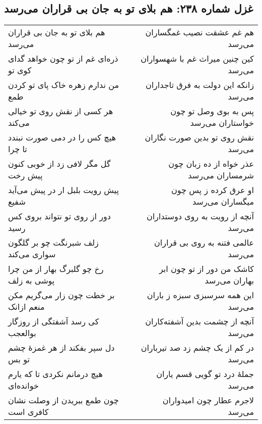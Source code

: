 \begin{center}
\section*{غزل شماره ۲۳۸: هم بلای تو به جان بی قراران می‌رسد}
\label{sec:238}
\begin{longtable}{l p{0.5cm} r}
هم بلای تو به جان بی قراران می‌رسد
&&
هم غم عشقت نصیب غمگساران می‌رسد
\\
ذره‌ای غم از تو چون خواهد گدای کوی تو
&&
کین چنین میراث غم با شهسواران می‌رسد
\\
من ندارم زهره خاک پای تو کردن طمع
&&
زانکه این دولت به فرق تاجداران می‌رسد
\\
هر کسی از نقش روی تو خیالی می‌کند
&&
پس به بوی وصل تو چون خواستاران می‌رسد
\\
هیچ کس را در دمی صورت نبندد تا چرا
&&
نقش روی تو بدین صورت نگاران می‌رسد
\\
گل مگر لافی زد از خوبی کنون پیش رخت
&&
عذر خواه از ده زبان چون شرمساران می‌رسد
\\
پیش رویت بلبل ار در پیش می‌آید شفیع
&&
او عرق کرده ز پس چون میگساران می‌رسد
\\
دور از روی تو نتواند بروی کس رسید
&&
آنچه از رویت به روی دوستداران می‌رسد
\\
زلف شبرنگت چو بر گلگون سواری می‌کند
&&
عالمی فتنه به روی بی قراران می‌رسد
\\
رخ چو گلبرگ بهار از من چرا پوشی به زلف
&&
کاشک من دور از تو چون ابر بهاران می‌رسد
\\
بر خطت چون زار می‌گریم مکن منعم ازانک
&&
این همه سرسبزی سبزه ز باران می‌رسد
\\
کی رسد آشفتگی از روزگار بوالعجب
&&
آنچه از چشمت بدین آشفته‌کاران می‌رسد
\\
دل سپر بفکند از هر غمزهٔ چشم تو بس
&&
در کم از یک چشم زد صد تیرباران می‌رسد
\\
هیچ درمانم نکردی تا که یارم خوانده‌ای
&&
جملهٔ درد تو گویی قسم یاران می‌رسد
\\
چون طمع ببریدن از وصلت نشان کافری است
&&
لاجرم عطار چون امیدواران می‌رسد
\\
\end{longtable}
\end{center}

